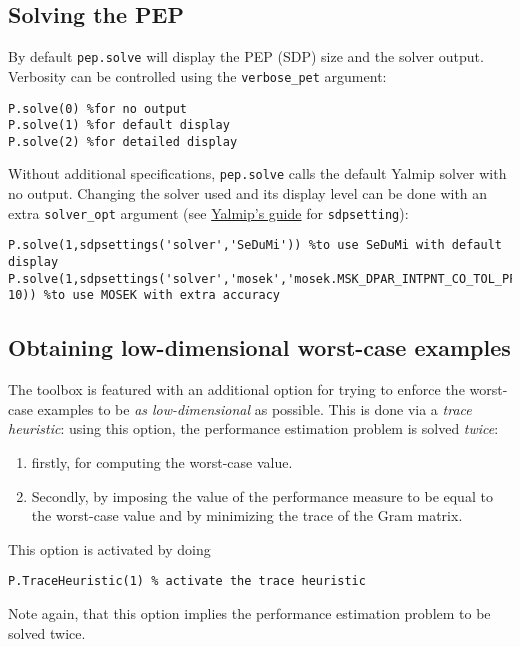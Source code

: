 \documentclass[11pt,a4paper]{article}
\begin{document}
\subsection{Solving the PEP}
By default \verb|pep.solve| will display the PEP (SDP) size and the solver output.
Verbosity can be controlled using the \verb?verbose_pet? argument:
\begin{lstlisting}
P.solve(0) %for no output
P.solve(1) %for default display
P.solve(2) %for detailed display
\end{lstlisting}
Without additional specifications, \verb|pep.solve| calls the default Yalmip solver with no output.
Changing the solver used and its display level can be done with an extra \verb|solver_opt| argument (see \href{https://yalmip.github.io/command/sdpsettings/}{Yalmip's guide} for \verb|sdpsetting|):
\begin{lstlisting}
P.solve(1,sdpsettings('solver','SeDuMi')) %to use SeDuMi with default display
P.solve(1,sdpsettings('solver','mosek','mosek.MSK_DPAR_INTPNT_CO_TOL_PFEAS',1e-10)) %to use MOSEK with extra accuracy
\end{lstlisting}
\subsection{Obtaining low-dimensional worst-case examples}
The toolbox is featured with an additional option for trying to enforce the worst-case examples to be \emph{as low-dimensional} as possible.
This is done via a \emph{trace heuristic}: using this option, the performance estimation problem is solved \emph{twice}:
\begin{enumerate}
	\item firstly, for computing the worst-case value.
	\item Secondly, by imposing the value of the performance measure to be equal to the worst-case value and by minimizing the trace of the Gram matrix.
\end{enumerate}
This option is activated by doing
\begin{lstlisting}
P.TraceHeuristic(1) % activate the trace heuristic
\end{lstlisting}
Note again, that this option implies the performance estimation problem to be solved twice.
\end{document}

